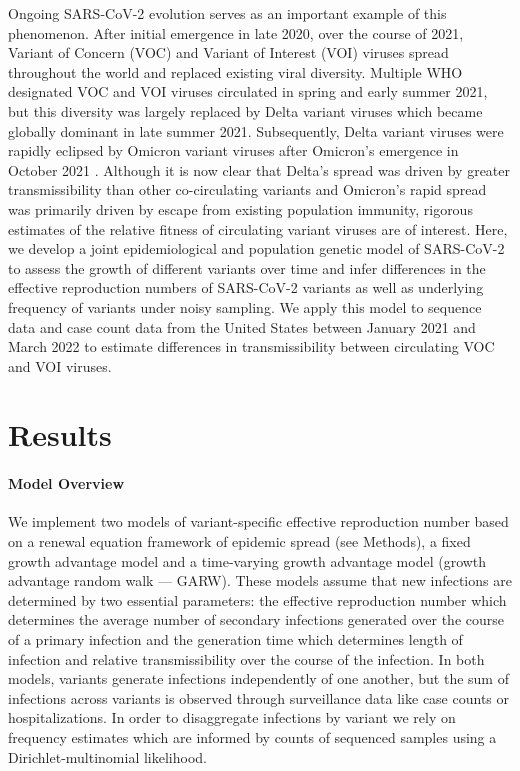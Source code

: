 \documentclass[11pt,oneside,letterpaper]{article}
\begin{document}
Ongoing SARS-CoV-2 evolution serves as an important example of this phenomenon.
After initial emergence in late 2020, over the course of 2021, Variant of Concern (VOC) and Variant of Interest (VOI) viruses spread throughout the world and replaced existing viral diversity.
Multiple WHO designated \cite{Konings2021} VOC and VOI viruses circulated in spring and early summer 2021, but this diversity was largely replaced by Delta variant viruses which became globally dominant in late summer 2021.
Subsequently, Delta variant viruses were rapidly eclipsed by Omicron variant viruses after Omicron's emergence in October 2021 \cite{viana2022rapid}.
Although it is now clear that Delta's spread was driven by greater transmissibility than other co-circulating variants and Omicron's rapid spread was primarily driven by escape from existing population immunity, rigorous estimates of the relative fitness of circulating variant viruses are of interest.
Here, we develop a joint epidemiological and population genetic model of SARS-CoV-2 to assess the growth of different variants over time and infer differences in the effective reproduction numbers of SARS-CoV-2 variants as well as underlying frequency of variants under noisy sampling.
We apply this model to sequence data and case count data from the United States between January 2021 and March 2022 to estimate differences in transmissibility between circulating VOC and VOI viruses.

\section*{Results}

\paragraph{Model Overview}%

We implement two models of variant-specific effective reproduction number based on a renewal equation framework of epidemic spread (see Methods), a fixed growth advantage model and a time-varying growth advantage model (growth advantage random walk --- GARW).
These models assume that new infections are determined by two essential parameters: the effective reproduction number which determines the average number of secondary infections generated over the course of a primary infection and the generation time which determines length of infection and relative transmissibility over the course of the infection.
In both models, variants generate infections independently of one another, but the sum of infections across variants is observed through surveillance data like case counts or hospitalizations.
In order to disaggregate infections by variant we rely on frequency estimates which are informed by counts of sequenced samples using a Dirichlet-multinomial likelihood.
\end{document}
